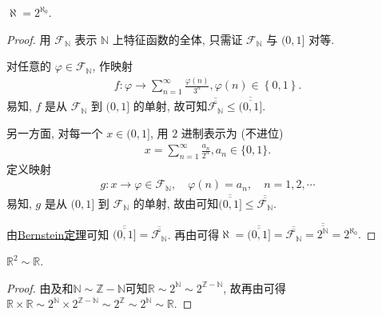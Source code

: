 \documentclass[../../main.tex]{subfiles}%
\begin{document}
\begin{theorem}\label{theorem:aleph = 2^{aleph_0}}
$\aleph = 2^{\aleph_0}$.
\end{theorem}
\begin{proof}
用 $\mathcal{F}_{\mathbb{N}}$ 表示 $\mathbb{N}$ 上特征函数的全体, 只需证 $\mathcal{F}_{\mathbb{N}}$ 与 $(0, 1]$ 对等.

对任意的 $\varphi \in \mathcal{F}_{\mathbb{N}}$, 作映射
\begin{align*}
f:\varphi \rightarrow \sum_{n=1}^{\infty}{\frac{\varphi (n)}{3^n}},\varphi \left( n \right) \in \left\{ 0,1 \right\} .
\end{align*}
易知, $f$ 是从 $\mathcal{F}_{\mathbb{N}}$ 到 $(0, 1]$ 的单射, 故可知$\overline{\overline{\mathcal{F}_{\mathbb{N}}}} \leqslant \overline{\overline{(0, 1]}}$.

另一方面, 对每一个 $x \in (0, 1]$, 用 $2$ 进制表示为 (不进位)
\begin{align*}
x = \sum_{n = 1}^{\infty} \frac{a_n}{2^n}, a_n \in \{0, 1\}.
\end{align*}
定义映射
\begin{align*}
g : x \to \varphi \in \mathcal{F}_{\mathbb{N}}, \quad \varphi(n) = a_n, \quad n = 1, 2, \cdots
\end{align*}
易知, $g$ 是从 $(0, 1]$ 到 $\mathcal{F}_{\mathbb{N}}$ 的单射, 故由可知$\overline{\overline{(0, 1]}} \leqslant \overline{\overline{\mathcal{F}_{\mathbb{N}}}}$.

由\hyperref[theorem:Cantor-Bernstein定理]{Bernstein定理}可知 $\overline{\overline{(0, 1]}} = \overline{\overline{\mathcal{F}_{\mathbb{N}}}}$. 再由可得$\aleph =\overline{\overline{(0,1]}}=\overline{\overline{\mathcal{F} _{\mathbb{N}}}}=\overline{\overline{2^{\mathbb{N}}}}=2^{\aleph _0}.$
\end{proof}

\begin{example}
$\mathbb{R}^2 \sim \mathbb{R}$.
\end{example}
\begin{proof}
由及和$\mathbb{N}\sim \mathbb{Z}-\mathbb{N}$可知$\mathbb{R} \sim 2^{\mathbb{N}} \sim 2^{\mathbb{Z} - \mathbb{N}}$, 故再由可得$\mathbb{R} \times \mathbb{R} \sim 2^{\mathbb{N}} \times 2^{\mathbb{Z} - \mathbb{N}} \sim 2^{\mathbb{Z}} \sim 2^{\mathbb{N}} \sim \mathbb{R}$.
\end{proof}
\end{document}
